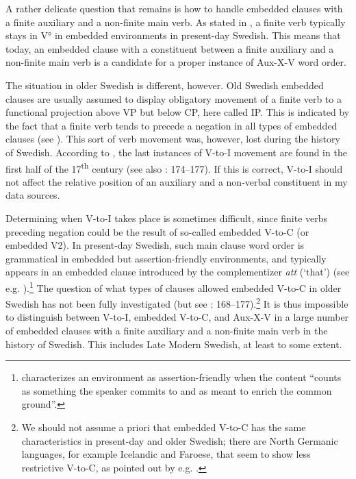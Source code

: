 \documentclass[output=paper, colorlinks, citecolor=brown]{langscibook}
\begin{document}
A rather delicate question that remains is how to handle embedded clauses with a finite auxiliary and a non-finite main verb. As stated in , a finite verb typically stays in V° in embedded environments in present-day Swedish. This means that today, an embedded clause with a constituent between a finite auxiliary and a non-finite main verb is a candidate for a proper instance of Aux-X-V word order.


The situation in older Swedish is different, however. Old Swedish embedded clauses are usually assumed to display obligatory movement of a finite verb to a functional projection above VP but below CP, here called IP. This is indicated by the fact that a finite verb tends to precede a negation in all types of embedded clauses (see \citealt{Platzack1988emergence,Falk1993,Hakansson2013}). This sort of verb movement was, however, lost during the history of Swedish. According to \citet{Platzack1988emergence}, the last instances of V-to-I movement are found in the first half of the 17\textsuperscript{th} century (see also \citealt{Falk1993}: 174–177). If this is correct, V-to-I should not affect the relative position of an auxiliary and a non-verbal constituent in my data sources.



Determining when V-to-I takes place is sometimes difficult, since finite verbs preceding negation could be the result of so-called embedded V-to-C (or embedded V2). In present-day Swedish, such main clause word order is grammatical in embedded but assertion-friendly environments, and typically appears in an embedded clause introduced by the complementizer \textit{att} (‘that’) (see e.g. \citealt{Petersson2014}).\footnote{\citet[4]{Gartner2016} characterizes an environment as assertion-friendly when the content “counts as something the speaker commits to and as meant to enrich the common ground”.} The question of what types of clauses allowed embedded V-to-C in older Swedish has not been fully investigated (but see \citealt{Falk1993}: 168–177).\footnote{We should not assume a priori that embedded V-to-C has the same characteristics in present-day and older Swedish; there are North Germanic languages, for example Icelandic and Faroese, that seem to show less restrictive V-to-C, as pointed out by e.g. \citet{Gartner2016}.} It is thus impossible to distinguish between V-to-I, embedded V-to-C, and Aux-X-V in a large number of embedded clauses with a finite auxiliary and a non-finite main verb in the history of Swedish. This includes Late Modern Swedish, at least to some extent.
\end{document}
